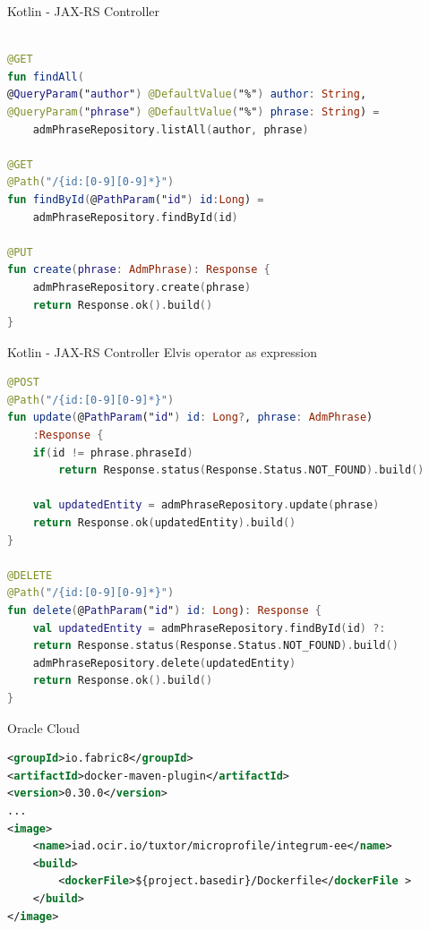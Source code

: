 \documentclass[aspectratio=169]{beamer}
\begin{document}
\begin{frame}[fragile]{Kotlin - JAX-RS Controller}
\begin{lstlisting}[language=Kotlin, basicstyle=\scriptsize\ttfamily]

@GET
fun findAll(
@QueryParam("author") @DefaultValue("%") author: String,
@QueryParam("phrase") @DefaultValue("%") phrase: String) =
    admPhraseRepository.listAll(author, phrase)

@GET
@Path("/{id:[0-9][0-9]*}")
fun findById(@PathParam("id") id:Long) =
    admPhraseRepository.findById(id)

@PUT
fun create(phrase: AdmPhrase): Response {
    admPhraseRepository.create(phrase)
    return Response.ok().build()
}
\end{lstlisting}
\end{frame}


\begin{frame}[fragile]{Kotlin - JAX-RS Controller}
Elvis operator as expression
\begin{lstlisting}[language=Kotlin, basicstyle=\scriptsize\ttfamily]
@POST
@Path("/{id:[0-9][0-9]*}")
fun update(@PathParam("id") id: Long?, phrase: AdmPhrase)
    :Response {
    if(id != phrase.phraseId)
        return Response.status(Response.Status.NOT_FOUND).build()

    val updatedEntity = admPhraseRepository.update(phrase)
    return Response.ok(updatedEntity).build()
}

@DELETE
@Path("/{id:[0-9][0-9]*}")
fun delete(@PathParam("id") id: Long): Response {
    val updatedEntity = admPhraseRepository.findById(id) ?:
    return Response.status(Response.Status.NOT_FOUND).build()
    admPhraseRepository.delete(updatedEntity)
    return Response.ok().build()
}
\end{lstlisting}

\end{frame}

\begin{frame}[fragile]{Oracle Cloud}
\begin{lstlisting}[language=XML, basicstyle=\scriptsize\ttfamily]
<groupId>io.fabric8</groupId>
<artifactId>docker-maven-plugin</artifactId>
<version>0.30.0</version>
...
<image>
    <name>iad.ocir.io/tuxtor/microprofile/integrum-ee</name>
    <build>
        <dockerFile>${project.basedir}/Dockerfile</dockerFile >
    </build>
</image>
\end{lstlisting}
\end{frame}
\end{document}
